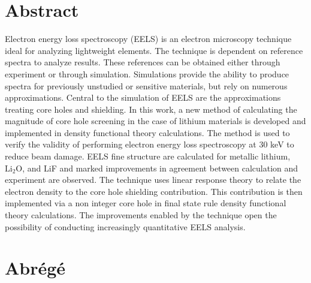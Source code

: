 \documentclass[12pt]{report}
\begin{document}



\renewcommand{\thepage}{\roman{page}}%
 
\tableofcontents





\chapter*{Abstract}



Electron energy loss spectroscopy (EELS) is an electron microscopy technique ideal for analyzing lightweight elements. The technique is dependent on reference spectra to analyze results. These references can be obtained either through experiment or through simulation.  Simulations provide the ability to produce spectra for previously unstudied or sensitive materials, but rely on numerous approximations. Central to the simulation of EELS are the approximations treating core holes and shielding.  In this work, a new method of calculating the magnitude of core hole screening in the case of lithium materials is developed and implemented in density functional theory calculations. The method is used to verify the validity of performing electron energy loss spectroscopy at 30 keV to reduce beam damage.  EELS fine structure are calculated for metallic lithium, $\mathrm{Li_2O}$, and LiF and marked improvements in agreement between calculation and experiment are observed. The technique uses linear response theory to relate the electron density to the core hole shielding contribution.  This contribution is then implemented via a non integer core hole in final state rule density functional theory calculations.  The improvements enabled by the technique open the possibility of conducting increasingly quantitative EELS analysis.
\\

\chapter*{Abr\'eg\'e}

\end{document}
